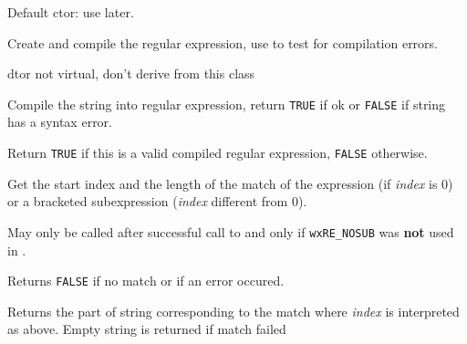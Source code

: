 
\label{wxregexwxregex}


Default ctor: use  later.


Create and compile the regular expression, use 
 to test for compilation errors.

\label{wxregexdtor}


dtor not virtual, don't derive from this class

\label{wxregexcompile}


Compile the string into regular expression, return {\tt TRUE} if ok or {\tt FALSE} 
if string has a syntax error.

\label{wxregexisvalid}


Return {\tt TRUE} if this is a valid compiled regular expression, {\tt FALSE} 
otherwise.

\label{wxregexgetmatch}


Get the start index and the length of the match of the expression
(if {\it index} is $0$) or a bracketed subexpression ({\it index} different
from $0$).

May only be called after successful call to  
and only if {\tt wxRE\_NOSUB} was {\bf not} used in 
.

Returns {\tt FALSE} if no match or if an error occured.


Returns the part of string corresponding to the match where {\it index} is
interpreted as above. Empty string is returned if match failed

